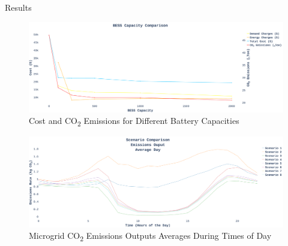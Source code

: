 \documentclass[final, 20 pt]{beamer}
\newlength{\twocolwid}
\begin{document}
\begin{frame}[t]
\begin{columns}[t]
\begin{column}{\twocolwid}
\begin{block}{Results}
	\begin{figure}[!htb] 		
		\includegraphics[width=\linewidth]{Fig/bess_capacity_comparison_scale}
		\caption{Cost and CO\textsubscript{2} Emissions for Different Battery Capacities}
		\label{fig:besscapacitycomparison}		
	\end{figure}
	
	\begin{figure}
		\centering
		\includegraphics[width=\linewidth]{Fig/emissions_scenario_comparison_run_3_scale}
		\caption{Microgrid CO\textsubscript{2} Emissions Outputs Averages During Times of Day}
		\label{fig:emissionsscenariocomparison}
	\end{figure}
	
\end{block}



%	



\end{column} %


\end{columns}
\end{frame}
\end{document}
